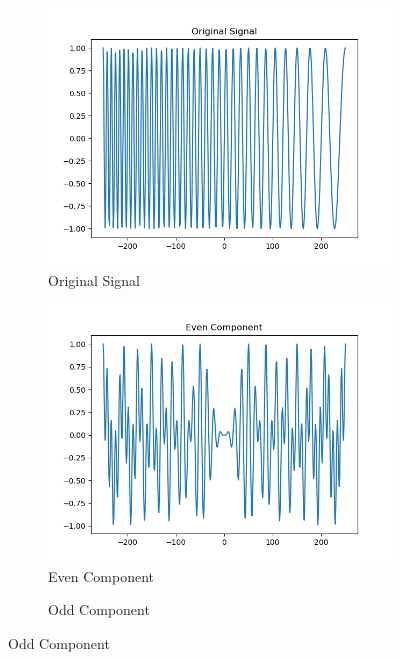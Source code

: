 \documentclass[10pt,a4paper, margin=1in]{article}
\begin{document}
\begin{enumerate}
\begin{enumerate}
\begin{figure}[h]
    \centering
    \begin{subfigure}[t]{0.3\linewidth}
        \centering
        \caption{Original Signal}
        \includegraphics[width=1\linewidth]{assets/q7a/chirp_part_a_original.png}
    \end{subfigure}
    \begin{subfigure}[t]{0.3\linewidth}
        \centering
        \caption{Even Component}
        \includegraphics[width=1\linewidth]{assets/q7a/chirp_part_a_even.png}
    \end{subfigure}
    \begin{subfigure}[t]{0.3\linewidth}
        \centering
        \caption{Odd Component}

\end{subfigure}
\end{figure}
\end{enumerate}
\end{enumerate}
\end{document}
